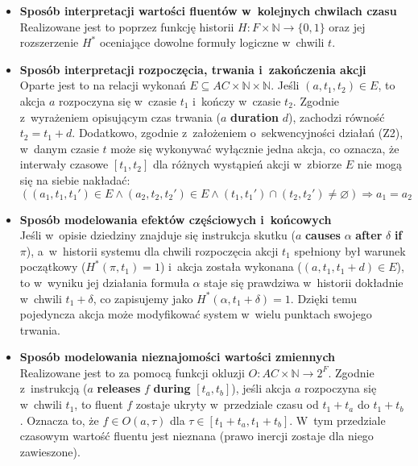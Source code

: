 \documentclass[12pt,a4paper]{article}
\begin{document}
\begin{itemize}
    \item \textbf{Sposób interpretacji wartości fluentów w~kolejnych chwilach czasu} \\
    Realizowane jest to poprzez funkcję historii $H : F \times \mathbb{N} \to \{0,1\}$ oraz jej rozszerzenie $H^*$ oceniające dowolne formuły logiczne w~chwili $t$.
    
    \item \textbf{Sposób interpretacji rozpoczęcia, trwania i~zakończenia akcji} \\
    Oparte jest to na relacji wykonań $E \subseteq AC \times \mathbb{N} \times \mathbb{N}$. Jeśli $(a, t_1, t_2) \in E$, to akcja $a$ rozpoczyna się w~czasie $t_1$ i~kończy w~czasie $t_2$. Zgodnie z~wyrażeniem opisującym czas trwania ($a$ \textbf{duration} $d$), zachodzi równość $t_2 = t_1 + d$. Dodatkowo, zgodnie z~założeniem o~sekwencyjności działań (Z2), w~danym czasie $t$ może się wykonywać wyłącznie jedna akcja, co oznacza, że interwały czasowe $[t_1, t_2]$ dla różnych wystąpień akcji w~zbiorze $E$ nie mogą się na siebie nakładać:
    \[
    ((a_1,t_1,t_1') \in E \land (a_2,t_2,t_2') \in E \land (t_1,t_1') \cap (t_2,t_2') \neq \varnothing) \Rightarrow a_1 = a_2
    \]

    \item \textbf{Sposób modelowania efektów częściowych i~końcowych} \\
    Jeśli w~opisie dziedziny znajduje się instrukcja skutku ($a$ \textbf{causes} $\alpha$ \textbf{after} $\delta$ \textbf{if} $\pi$), a~w~historii systemu dla chwili rozpoczęcia akcji $t_1$ spełniony był warunek początkowy ($H^*(\pi, t_1) = 1$) i~akcja została wykonana ($(a, t_1, t_1+d) \in E$), to w~wyniku jej działania formuła $\alpha$ staje się prawdziwa w~historii dokładnie w~chwili $t_1+\delta$, co zapisujemy jako $H^*(\alpha, t_1+\delta) = 1$. Dzięki temu pojedyncza akcja może modyfikować system w~wielu punktach swojego trwania.

    \item \textbf{Sposób modelowania nieznajomości wartości zmiennych} \\
    Realizowane jest to za pomocą funkcji okluzji $O : AC \times \mathbb{N} \to 2^F$. Zgodnie z~instrukcją ($a$ \textbf{releases} $f$ \textbf{during} $[t_a, t_b]$), jeśli akcja $a$ rozpoczyna się w~chwili $t_1$, to fluent $f$ zostaje ukryty w~przedziale czasu od $t_1+t_a$ do $t_1+t_b$. Oznacza to, że $f \in O(a, \tau)$ dla $\tau \in [t_1+t_a, t_1+t_b]$. W~tym przedziale czasowym wartość fluentu jest nieznana (prawo inercji zostaje dla niego zawieszone).


\end{itemize}
\end{document}
